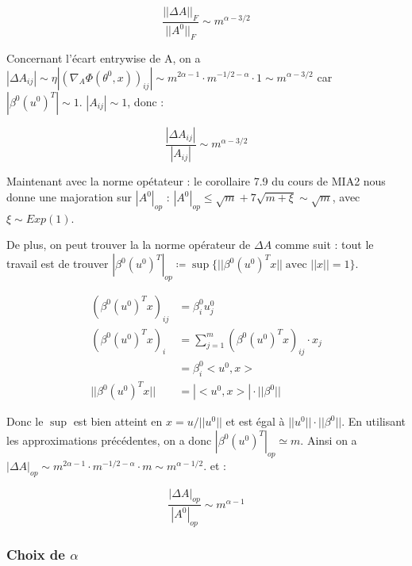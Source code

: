 \documentclass[a4paper, 11pt, french]{article}
\theoremstyle{definition}
\begin{document}
	\[\frac{||\Delta A||_F}{||A^0||_F} \sim m^{\alpha - 3/2}\]
	
	Concernant l'écart entrywise de A, on a $|\Delta A_{ij}| \sim \eta | (\nabla_A \Phi(\theta^0, x))_{ij} | \sim m^{2\alpha - 1} \cdot m^{-1/2 - \alpha} \cdot 1 \sim m^{\alpha - 3/2}$ car $|\beta^0 (u^0)^T| \sim 1$. $|A_{ij}| \sim 1$, donc :

	\[\frac{|\Delta A_{ij}|}{|A_{ij}|} \sim m^{\alpha - 3/2}\]
	
	Maintenant avec la norme opétateur : le corollaire 7.9 du cours de MIA2 nous donne une majoration sur $|A^0|_{op}$ : $|A^0|_{op} \leq \sqrt{m} + 7\sqrt{m + \xi} \sim \sqrt{m}$, avec $\xi \sim Exp(1)$.
	
	De plus, on peut trouver la la norme opérateur de $\Delta A$ comme suit : tout le travail est de trouver $|\beta^0 (u^0)^T|_{op} \coloneqq \sup \{||\beta^0 (u^0)^T x|| \; 
	\text{avec }||x|| = 1\}$.
	
	\begin{align}
		(\beta^0 (u^0)^T x)_{ij} &= \beta^0_i u^0_j \\
		(\beta^0 (u^0)^T x)_i &= \sum_{j=1}^{m} (\beta^0 (u^0)^T x)_{ij} \cdot x_j \\
		&= \beta^0_i < u^0, x> \\
		||\beta^0 (u^0)^T x|| &= |< u^0, x>| \cdot ||\beta^0||
	\end{align}

	Donc le $\sup$ est bien atteint en $x = u / ||u^0||$ et est égal à $||u^0|| \cdot ||\beta^0||$. En utilisant les approximations précédentes, on a donc $|\beta^0 (u^0)^T|_{op} \simeq m$. Ainsi on a $|\Delta A|_{op} \sim m^{2\alpha - 1} \cdot m^{-1/2 - \alpha} \cdot m \sim m^{\alpha - 1/2}.$ et :
	
	\[\frac{|\Delta A|_{op}}{|A^0|_{op}} \sim m^{\alpha - 1}\]
	
	\subsubsection{Choix de $\alpha$}
	
\end{document}
